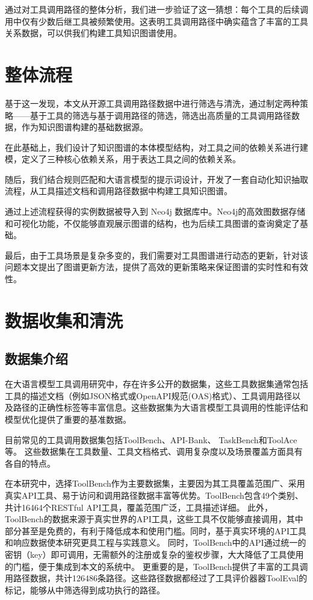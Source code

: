 通过对工具调用路径的整体分析，我们进一步验证了这一猜想：每个工具的后续调用中仅有少数后继工具被频繁使用。这表明工具调用路径中确实蕴含了丰富的工具关系数据，可以供我们构建工具知识图谱使用。

\section{整体流程}

基于这一发现，本文从开源工具调用路径数据中进行筛选与清洗，通过制定两种策略——基于工具的筛选与基于调用路径的筛选，筛选出高质量的工具调用路径数据，作为知识图谱构建的基础数据源。

在此基础上，我们设计了知识图谱的本体模型结构，对工具之间的依赖关系进行建模，定义了三种核心依赖关系，用于表达工具之间的依赖关系。

随后，我们结合规则匹配和大语言模型的提示词设计，开发了一套自动化知识抽取流程，从工具描述文档和调用路径数据中构建工具知识图谱。

通过上述流程获得的实例数据被导入到 Neo4j 数据库中。Neo4j的高效图数据存储和可视化功能，不仅能够直观展示图谱的结构，也为后续工具图谱的查询奠定了基础。

最后，由于工具场景是复杂多变的，我们需要对工具图谱进行动态的更新，针对该问题本文提出了图谱更新方法，提供了高效的更新策略来保证图谱的实时性和有效性。

\section{数据收集和清洗}

\subsection{数据集介绍}

在大语言模型工具调用研究中，存在许多公开的数据集，这些工具数据集通常包括工具的描述文档（例如JSON格式\cite{Qin2023}或OpenAPI规范(OAS)\cite{Song2023}格式）、工具调用路径\cite{Qin2023, liu2024toolace}以及路径的正确性标签等丰富信息。这些数据集为大语言模型工具调用的性能评估和模型优化提供了重要的基准数据。

\sloppy
目前常见的工具调用数据集包括ToolBench\cite{Qin2023}、API-Bank\cite{Li2023c}、
TaskBench\cite{shen2023taskbench}和ToolAce\cite{liu2024toolace}等。
这些数据集在工具数量、工具文档格式、调用复杂度以及场景覆盖方面具有各自的特点。
\relax

在本研究中，选择ToolBench作为主要数据集，主要因为其工具覆盖范围广、采用真实API工具、易于访问和调用路径数据丰富等优势。ToolBench包含49个类别、共计16464个RESTful API工具，覆盖范围广泛，工具描述详细。
此外，ToolBench的数据来源于真实世界的API工具，这些工具不仅能够直接调用，其中部分甚至是免费的，有利于降低成本和使用门槛。同时，基于真实环境的API工具和响应数据使本研究更具工程与实践意义。
同时，ToolBench中的API通过统一的密钥（key）即可调用，无需额外的注册或复杂的鉴权步骤，大大降低了工具使用的门槛，便于集成到本文的系统中。
更重要的是，ToolBench提供了丰富的工具调用路径数据，共计126486条路径。这些路径数据都经过了工具评价器器ToolEval\cite{Qin2023}的标记，能够从中筛选得到成功执行的路径。

